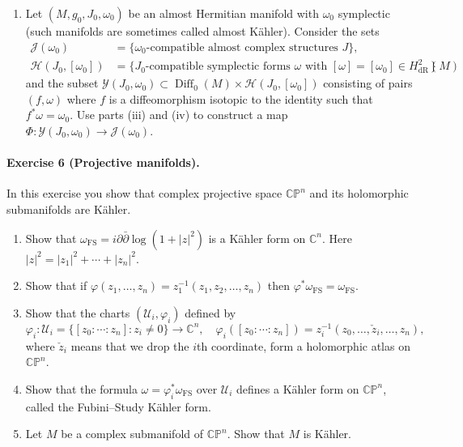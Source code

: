 \documentclass{article}
\theoremstyle{definition}
\DeclareMathOperator{\Diff}{Diff}
\newcommand{\dR}{\mathrm{dR}}
\newcommand{\FS}{\mathrm{FS}}
\newcommand{\calY}{\mathcal{Y}}
\newcommand{\calH}{\mathcal{H}}
\newcommand{\calJ}{\mathcal{J}}
\newcommand{\U}{\mathcal{U}}
\newcommand{\CP}{\mathbb{CP}}
\newcommand{\C}{\mathbb{C}}
\begin{document}
\begin{enumerate}[label=(\roman*)]
    \item Let $(M,g_0,J_0,\omega_0)$ be an almost Hermitian manifold with
        $\omega_0$ symplectic (such manifolds are sometimes called almost
        K\"ahler). Consider the sets
        \begin{align*}
            \calJ(\omega_0)
                &= \{\text{$\omega_0$-compatible almost complex structures
                    $J$}\}, \\
            \calH(J_0,[\omega_0])
                &= \{\text{$J_0$-compatible symplectic forms $\omega$ with
                    $[\omega]=[\omega_0]\in H^2_\dR(M)$}\}
        \end{align*}
        and the subset
        $\calY(J_0,\omega_0)\subset\Diff_0(M)\times\calH(J_0,[\omega_0])$
        consisting of pairs $(f,\omega)$ where $f$ is a diffeomorphism isotopic
        to the identity such that $f^*\omega=\omega_0$. Use parts (iii) and (iv)
        to construct a map $\Phi:\calY(J_0,\omega_0)\to\calJ(\omega_0)$.
\end{enumerate}

\paragraph{Exercise 6 {\normalfont(Projective manifolds)}.} In this exercise you
show that complex projective space $\CP^n$ and its holomorphic submanifolds are
K\"ahler.
\begin{enumerate}[label=(\roman*)]
    \item Show that $\omega_\FS=i\partial\bar\partial\log(1+|z|^2)$ is a
        K\"ahler form on $\C^n$. Here $|z|^2=|z_1|^2+\cdots+|z_n|^2$.

    \item Show that if $\varphi(z_1,\ldots,z_n)=z_1^{-1}(z_1,z_2,\ldots,z_n)$
        then $\varphi^*\omega_\FS=\omega_\FS$.

    \item Show that the charts $(\U_i,\varphi_i)$ defined by
        \begin{equation*}
            \varphi_i:\U_i=\bigl\{[z_0:\cdots:z_n] : z_i\ne0\bigr\}\to\C^n,
            \quad
            \varphi_i([z_0:\cdots:z_n])
                = z_i^{-1}(z_0,\ldots,\check z_i,\ldots,z_n),
        \end{equation*}
        where $\check z_i$ means that we drop the $i$th coordinate, form a
        holomorphic atlas on $\CP^n$.

    \item Show that the formula $\omega=\varphi_i^*\omega_\FS$ over $\U_i$
        defines a K\"ahler form on $\CP^n$, called the Fubini--Study K\"ahler
        form.

    \item Let $M$ be a complex submanifold of $\CP^n$. Show that $M$ is
        K\"ahler.
\end{enumerate}
\end{document}
